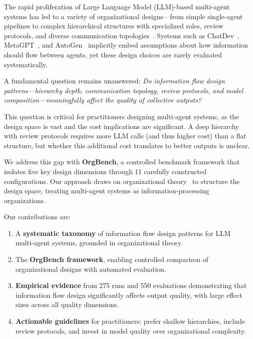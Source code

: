\documentclass[conference]{IEEEtran}
\begin{document}
The rapid proliferation of Large Language Model (LLM)-based multi-agent systems has led to a variety of organizational designs---from simple single-agent pipelines to complex hierarchical structures with specialized roles, review protocols, and diverse communication topologies~\cite{guo2024largelanguagemodelbased, wang2024survey}.
Systems such as ChatDev~\cite{qian2024chatdev}, MetaGPT~\cite{hong2023metagpt}, and AutoGen~\cite{wu2023autogen} implicitly embed assumptions about how information should flow between agents, yet these design choices are rarely evaluated systematically.

A fundamental question remains unanswered: \emph{Do information flow design patterns---hierarchy depth, communication topology, review protocols, and model composition---meaningfully affect the quality of collective outputs?}

This question is critical for practitioners designing multi-agent systems, as the design space is vast and the cost implications are significant.
A deep hierarchy with review protocols requires more LLM calls (and thus higher cost) than a flat structure, but whether this additional cost translates to better outputs is unclear.

We address this gap with \textbf{OrgBench}, a controlled benchmark framework that isolates five key design dimensions through 11 carefully constructed configurations.
Our approach draws on organizational theory~\cite{mintzberg1979structuring, galbraith1974designing} to structure the design space, treating multi-agent systems as information-processing organizations.

Our contributions are:
\begin{enumerate}
    \item A \textbf{systematic taxonomy} of information flow design patterns for LLM multi-agent systems, grounded in organizational theory.
    \item The \textbf{OrgBench framework}, enabling controlled comparison of organizational designs with automated evaluation.
    \item \textbf{Empirical evidence} from 275 runs and 550 evaluations demonstrating that information flow design significantly affects output quality, with large effect sizes across all quality dimensions.
    \item \textbf{Actionable guidelines} for practitioners: prefer shallow hierarchies, include review protocols, and invest in model quality over organizational complexity.
\end{enumerate}
\end{document}

